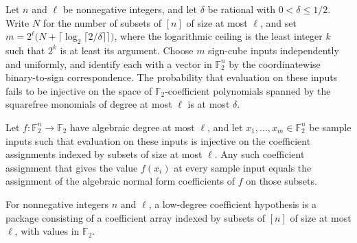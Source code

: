 \begin{theorem}
\leanok
{}
Let $n$ and $\ell$ be nonnegative integers, and let $\delta$ be rational with
$0<\delta\le 1/2$. Write $N$ for the number of subsets of $[n]$ of size at most $\ell$,
and set $m=2^\ell\bigl(N+\lceil\log_2\lceil 2/\delta\rceil\rceil\bigr)$, where the
logarithmic ceiling is the least integer $k$ such that $2^k$ is at least its argument.
Choose $m$ sign-cube inputs independently and uniformly, and identify each with a vector
in $\mathbb F_2^n$ by the coordinatewise binary-to-sign correspondence. The probability
that evaluation on these inputs fails to be injective on the space of $\mathbb
F_2$-coefficient polynomials spanned by the squarefree monomials of degree at most
$\ell$ is at most $\delta$.
\end{theorem}

\begin{theorem}
\label{FABL.coefficients_eq_of_separates_of_satisfies}
\leanok
{}
Let $f:\mathbb F_2^n\to\mathbb F_2$ have algebraic degree at most $\ell$, and let
$x_1,\ldots,x_m\in\mathbb F_2^n$ be sample inputs such that evaluation on these inputs
is injective on the coefficient assignments indexed by subsets of size at most $\ell$.
Any such coefficient assignment that gives the value $f(x_i)$ at every sample input
equals the assignment of the algebraic normal form coefficients of $f$ on those subsets.
\end{theorem}

\begin{definition}
\leanok
{}
For nonnegative integers $n$ and $\ell$, a low-degree coefficient hypothesis is a
package consisting of a coefficient array indexed by subsets of $[n]$ of size at most
$\ell$, with values in $\mathbb F_2$.
\end{definition}

